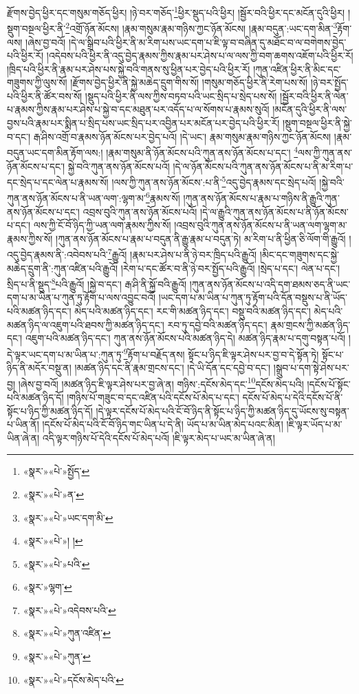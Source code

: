 རྫོགས་བྱེད་ཕྱིར་དང་གསུམ་གཅོད་ཕྱིར། །ཉེ་བར་གཅོད་\footnote{«སྣར་»«པེ་»སྤྱོད་}ཕྱིར་སྡུད་པའི་ཕྱིར། །སྦྱོར་བའི་ཕྱིར་དང་མངོན་དུའི་ཕྱིར། །སྡུག་བསྔལ་ཕྱིར་ནི་\footnote{«སྣར་»«པེ་»ན་}འགྲོ་ཉོན་མོངས། །རྣམ་གསུམ་རྣམ་གཉིས་ཀྱང་ཉོན་མོངས། །རྣམ་བདུན་:ཡང་དག་མིན་\footnote{«སྣར་»«པེ་»ཡང་དག་མི་}རྟོག་ལས། །ཞེས་བྱ་བའོ། །དེ་ལ་སྒྲིབ་པའི་ཕྱིར་ནི་མ་རིག་པས་ཡང་དག་པ་ཇི་ལྟ་བ་བཞིན་དུ་མཐོང་བ་ལ་བགེགས་བྱེད་པའི་ཕྱིར་རོ། །འདེབས་པའི་ཕྱིར་ནི་འདུ་བྱེད་རྣམས་ཀྱིས་རྣམ་པར་ཤེས་པ་ལ་ལས་ཀྱི་བག་ཆགས་འཇོག་པའི་ཕྱིར་རོ། །ཁྲིད་པའི་ཕྱིར་ནི་རྣམ་པར་ཤེས་པས་སྐྱེ་བའི་གནས་སུ་ཕྱིན་པར་བྱེད་པའི་ཕྱིར་རོ། །ཀུན་འཛིན་ཕྱིར་ནི་མིང་དང་གཟུགས་ཀྱི་ལུས་སོ། །རྫོགས་བྱེད་ཕྱིར་ནི་སྐྱེ་མཆེད་དྲུག་གིས་སོ། །གསུམ་གཅོད་ཕྱིར་ནི་རེག་པས་སོ། །ཉེ་བར་སྤྱོད་པའི་ཕྱིར་ནི་ཚོར་བས་སོ། །སྡུད་པའི་ཕྱིར་ནི་ལས་ཀྱིས་བཏབ་པའི་ཡང་སྲིད་པ་སྲེད་པས་སོ། །སྦྱོར་བའི་ཕྱིར་ནི་ལེན་པ་རྣམས་ཀྱིས་རྣམ་པར་ཤེས་པ་སྐྱེ་བ་དང་མཐུན་པར་འདོད་པ་ལ་སོགས་པ་རྣམས་སུའོ། །མངོན་དུའི་ཕྱིར་ནི་ལས་བྱས་པའི་རྣམ་པར་སྨིན་པ་སྲིད་པས་ཡང་སྲིད་པར་འབྱིན་པར་མངོན་པར་བྱེད་པའི་ཕྱིར་རོ། །སྡུག་བསྔལ་ཕྱིར་ནི་སྐྱེ་བ་དང་། རྒ་ཤིས་འགྲོ་བ་རྣམས་ཉོན་མོངས་པར་བྱེད་པའོ། །དེ་ཡང་། རྣམ་གསུམ་རྣམ་གཉིས་ཀྱང་ཉོན་མོངས། །རྣམ་བདུན་ཡང་དག་མིན་རྟོག་ལས:། །རྣམ་གསུམ་ནི་ཉོན་མོངས་པའི་ཀུན་ནས་ཉོན་མོངས་པ་དང་། \footnote{«སྣར་»«པེ་»། ། }ལས་ཀྱི་ཀུན་ནས་ཉོན་མོངས་པ་དང་། སྐྱེ་བའི་ཀུན་ནས་ཉོན་མོངས་པའོ། །དེ་ལ་ཉོན་མོངས་པའི་ཀུན་ནས་ཉོན་མོངས་པ་ནི་མ་རིག་པ་དང་སྲེད་པ་དང་ལེན་པ་རྣམས་སོ། །ལས་ཀྱི་ཀུན་ནས་ཉོན་མོངས་:པ་ནི་\footnote{«སྣར་»«པེ་»པའི་}འདུ་བྱེད་རྣམས་དང་སྲེད་པའོ། །སྐྱེ་བའི་ཀུན་ནས་ཉོན་མོངས་པ་ནི་ཡན་ལག་:ལྷག་མ་\footnote{«སྣར་»ལྷག་}རྣམས་སོ། །ཀུན་ནས་ཉོན་མོངས་པ་རྣམ་པ་གཉིས་ནི་རྒྱུའི་ཀུན་ནས་ཉོན་མོངས་པ་དང་། འབྲས་བུའི་ཀུན་ནས་ཉོན་མོངས་པའོ། །དེ་ལ་རྒྱུའི་ཀུན་ནས་ཉོན་མོངས་པ་ནི་ཉོན་མོངས་པ་དང་། ལས་ཀྱི་ངོ་བོ་ཉིད་ཀྱི་ཡན་ལག་རྣམས་ཀྱིས་སོ། །འབྲས་བུའི་ཀུན་ནས་ཉོན་མོངས་པ་ནི་ཡན་ལག་ལྷག་མ་རྣམས་ཀྱིས་སོ། །ཀུན་ནས་ཉོན་མོངས་པ་རྣམ་པ་བདུན་ནི་རྒྱུ་རྣམ་པ་བདུན་ཏེ། མ་རིག་པ་ནི་ཕྱིན་ཅི་ལོག་གི་རྒྱུའོ། །འདུ་བྱེད་རྣམས་ནི་:འབེབས་པའི་\footnote{«སྣར་»«པེ་»འདེབས་པའི་}རྒྱུའོ། །རྣམ་པར་ཤེས་པ་ནི་ཉེ་བར་ཁྲིད་པའི་རྒྱུའོ། །མིང་དང་གཟུགས་དང་སྐྱེ་མཆེད་དྲུག་ནི་:ཀུན་འཛིན་པའི་རྒྱུའོ། །རེག་པ་དང་ཚོར་བ་ནི་ཉེ་བར་སྤྱོད་པའི་རྒྱུའོ། །སྲེད་པ་དང་། ལེན་པ་དང་། སྲིད་པ་ནི་སྡུད་\footnote{«སྣར་»«པེ་»ཀུན་འཛིན་}པའི་རྒྱུའོ། །སྐྱེ་བ་དང་། རྒ་ཤི་ནི་སྐྱོ་བའི་རྒྱུའོ། །ཀུན་ནས་ཉོན་མོངས་པ་འདི་དག་ཐམས་ཅད་ནི་ཡང་དག་པ་མ་ཡིན་པ་ཀུན་ཏུ་རྟོག་པ་ལས་འབྱུང་བའོ། །ཡང་དག་པ་མ་ཡིན་པ་ཀུན་ཏུ་རྟོག་པའི་དོན་བསྡུས་པ་ནི་ཡོད་པའི་མཚན་ཉིད་དང་། མེད་པའི་མཚན་ཉིད་དང་། རང་གི་མཚན་ཉིད་དང་། བསྡུ་བའི་མཚན་ཉིད་དང་། མེད་པའི་མཚན་ཉིད་ལ་འཇུག་པའི་ཐབས་ཀྱི་མཚན་ཉིད་དང་། རབ་ཏུ་དབྱེ་བའི་མཚན་ཉིད་དང་། རྣམ་གྲངས་ཀྱི་མཚན་ཉིད་དང་། འཇུག་པའི་མཚན་ཉིད་དང་། ཀུན་ནས་ཉོན་མོངས་པའི་མཚན་ཉིད་དེ། མཚན་ཉིད་རྣམ་པ་དགུ་བསྟན་པའོ། །དེ་ལྟར་ཡང་དག་པ་མ་ཡིན་པ་:ཀུན་ཏུ་\footnote{«སྣར་»«པེ་»ཀུན་}རྟོག་པ་བརྗོད་ནས། སྟོང་པ་ཉིད་ཇི་ལྟར་ཤེས་པར་བྱ་བ་དེ་སྟོན་ཏེ། སྟོང་པ་ཉིད་ནི་མདོར་བསྡུ་ན། །མཚན་ཉིད་དང་ནི་རྣམ་གྲངས་དང་། །དེ་ཡི་དོན་དང་དབྱེ་བ་དང་། །སྒྲུབ་པ་དག་སྟེ་ཤེས་པར་བྱ། །ཞེས་བྱ་བའོ། །མཚན་ཉིད་ཇི་ལྟར་ཤེས་པར་བྱ་ཞེ་ན། གཉིས་:དངོས་མེད་དང་\footnote{«སྣར་»«པེ་»དངོས་མེད་པའི་}དངོས་མེད་པའི། །དངོས་པོ་སྟོང་པའི་མཚན་ཉིད་དོ། །གཉིས་པོ་གཟུང་བ་དང་འཛིན་པའི་དངོས་པོ་མེད་པ་དང་། དངོས་པོ་མེད་པ་དེའི་དངོས་པོ་ནི་སྟོང་པ་ཉིད་ཀྱི་མཚན་ཉིད་དོ། །དེ་ལྟར་དངོས་པོ་མེད་པའི་ངོ་བོ་ཉིད་ནི་སྟོང་པ་ཉིད་ཀྱི་མཚན་ཉིད་དུ་ཡོངས་སུ་བསྟན་པ་ཡིན་ནོ། །དངོས་པོ་མེད་པའི་ངོ་བོ་ཉིད་གང་ཡིན་པ་དེ་ནི། ཡོད་པ་མ་ཡིན་མེད་པའང་མིན། །ཇི་ལྟར་ཡོད་པ་མ་ཡིན་ཞེ་ན། འདི་ལྟར་གཉིས་པོ་དེའི་དངོས་པོ་མེད་པའོ། །ཇི་ལྟར་མེད་པ་ཡང་མ་ཡིན་ཞེ་ན། 